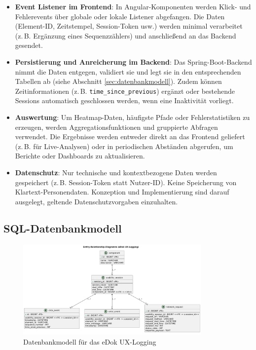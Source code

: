 \documentclass[12pt,oneside]{article}
\begin{document}
\begin{itemize}
    \item \textbf{Event Listener im Frontend}: In Angular-Komponenten werden Klick- und Fehlerevents über globale oder lokale Listener abgefangen. Die Daten (Element-ID, Zeitstempel, Session-Token usw.) werden minimal verarbeitet (z.\,B. Ergänzung eines Sequenzzählers) und anschließend an das Backend gesendet.
    \item \textbf{Persistierung und Anreicherung im Backend}: Das Spring-Boot-Backend nimmt die Daten entgegen, validiert sie und legt sie in den entsprechenden Tabellen ab (siehe Abschnitt \ref{sec:datenbankmodell}). Zudem können Zeitinformationen (z.\,B. \texttt{time\_since\_previous}) ergänzt oder bestehende Sessions automatisch geschlossen werden, wenn eine Inaktivität vorliegt.
    \item \textbf{Auswertung}: Um Heatmap-Daten, häufigste Pfade oder Fehlerstatistiken zu erzeugen, werden Aggregationsfunktionen und gruppierte Abfragen verwendet. Die Ergebnisse werden entweder direkt an das Frontend geliefert (z.\,B. für Live-Analysen) oder in periodischen Abständen abgerufen, um Berichte oder Dashboards zu aktualisieren.
    \item \textbf{Datenschutz}: Nur technische und kontextbezogene Daten werden gespeichert (z.\,B. Session-Token statt Nutzer-ID). Keine Speicherung von Klartext-Personendaten. Konzeption und Implementierung sind darauf ausgelegt, geltende Datenschutzvorgaben einzuhalten.
\end{itemize}

\subsection{SQL-Datenbankmodell}
\begin{figure}[htb]
  \centering
  \includegraphics[width=0.85\textwidth]{erd-logging.png}
  \caption{Datenbankmodell für das eDok UX-Logging}
  \label{fig:erd-logging}
\end{figure}
\end{document}
